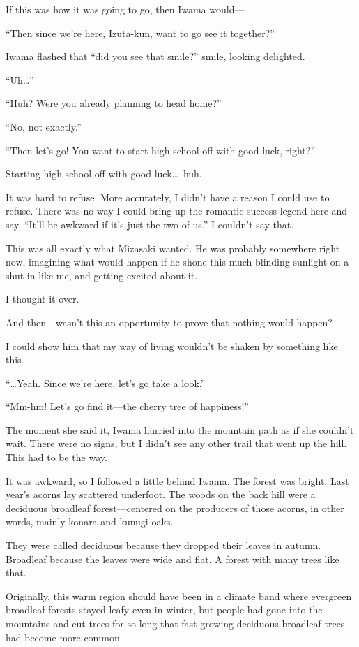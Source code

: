 \documentclass[
    a4paper,
    12pt,
    twoside,
    openany,
    UTF8,
    fontset=windows
]{ctexbook}
\begin{document}
If this was how it was going to go, then Iwama would---

``Then since we're here, Izuta-kun, want to go see it together?''

Iwama flashed that ``did you see that smile?'' smile, looking delighted.

``Uh\dots''

``Huh? Were you already planning to head home?''

``No, not exactly.''

``Then let's go! You want to start high school off with good luck, right?''

Starting high school off with good luck\dots\ huh.

It was hard to refuse. More accurately, I didn't have a reason I could use to refuse. There was no way I could bring up the romantic-success legend here and say, ``It'll be awkward if it's just the two of us.'' I couldn't say that.

This was all exactly what Mizasaki wanted. He was probably somewhere right now, imagining what would happen if he shone this much blinding sunlight on a shut-in like me, and getting excited about it.

I thought it over.

And then---wasn't this an opportunity to prove that nothing would happen?

I could show him that my way of living wouldn't be shaken by something like this.

``\dots Yeah. Since we're here, let's go take a look.''

``Mm-hm! Let's go find it---the cherry tree of happiness!''

The moment she said it, Iwama hurried into the mountain path as if she couldn't wait. There were no signs, but I didn't see any other trail that went up the hill. This had to be the way.

It was awkward, so I followed a little behind Iwama. The forest was bright. Last year's acorns lay scattered underfoot. The woods on the back hill were a deciduous broadleaf forest---centered on the producers of those acorns, in other words, mainly konara and kunugi oaks.

They were called deciduous because they dropped their leaves in autumn. Broadleaf because the leaves were wide and flat. A forest with many trees like that.

Originally, this warm region should have been in a climate band where evergreen broadleaf forests stayed leafy even in winter, but people had gone into the mountains and cut trees for so long that fast-growing deciduous broadleaf trees had become more common.
\end{document}
